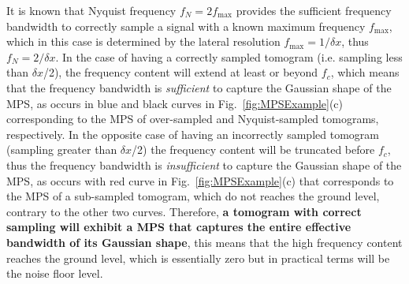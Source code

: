 It is known that Nyquist frequency $f_N = 2f_{\text{max}}$ provides the sufficient frequency bandwidth to correctly sample a signal with a known maximum frequency $f_{\text{max}}$, which in this case is determined by the lateral resolution $f_{\text{max}} = 1 / \delta x$, thus $f_N=2/\delta x$. In the case of having a correctly sampled tomogram (i.e. sampling less than $\delta x$/2), the frequency content will extend at least or beyond $f_c$, which means that the frequency bandwidth is \textit{sufficient} to capture the Gaussian shape of the MPS, as occurs in blue and black curves in Fig.~\ref{fig:MPSExample}(c) corresponding to the MPS of over-sampled and Nyquist-sampled tomograms, respectively. In the opposite case of having an incorrectly sampled tomogram (sampling greater than $\delta x$/2) the frequency content will be truncated before $f_c$, thus the frequency bandwidth is \textit{insufficient} to capture the Gaussian shape of the MPS, as occurs with red curve in Fig.~\ref{fig:MPSExample}(c) that corresponds to the MPS of a sub-sampled tomogram, which do not reaches the ground level, contrary to the other two curves. Therefore, \textbf{a tomogram with correct sampling will exhibit a MPS that captures the entire effective bandwidth of its Gaussian shape}, this means that the high frequency content reaches the ground level, which is essentially zero but in practical terms will be the noise floor level.

